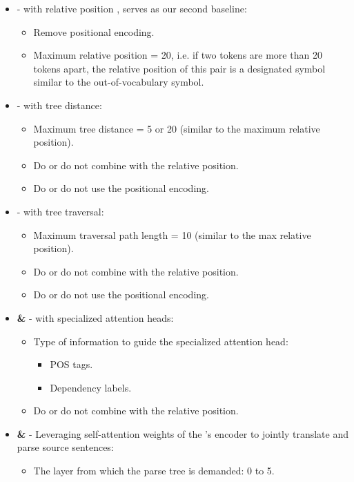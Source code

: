 \begin{itemize}
    \item \textbf{\transformerrel} - \transformer with relative position \citep{DBLP:conf/naacl/ShawUV18}, serves as our second baseline:
        \begin{itemize}
            \item Remove positional encoding.
            \item Maximum relative position = 20, i.e. if two tokens are more than 20 tokens apart, the relative position of this pair is a designated symbol similar to the out-of-vocabulary symbol.
        \end{itemize}
    \item \textbf{\TreeDistance} - \transformer with tree distance:
        \begin{itemize}
            \item Maximum tree distance = 5 or 20 (similar to the maximum relative position).
            \item Do or do not combine with the relative position.
            \item Do or do not use the positional encoding.
        \end{itemize}
    \item \textbf{\TreeTraversal} - \transformer with tree traversal:
        \begin{itemize}
            \item Maximum traversal path length = 10 (similar to the max relative position).
            \item Do or do not combine with the relative position.
            \item Do or do not use the positional encoding.
        \end{itemize}
    \item \textbf{\SpecPOS \& \SpecDep} - \transformer with specialized attention heads:
        \begin{itemize}
            \item Type of information to guide the specialized attention head:
                \begin{itemize}
                    \item POS tags.
                    \item Dependency labels.
                \end{itemize}
            \item Do or do not combine with the relative position.
        \end{itemize}
    \item \textbf{\DepParse \& \DiagonalParse} - Leveraging self-attention weights of the \transformer's encoder to jointly translate and parse source sentences:
        \begin{itemize}
            \item The layer from which the parse tree is demanded: 0 to 5.
        \end{itemize}
\end{itemize}

